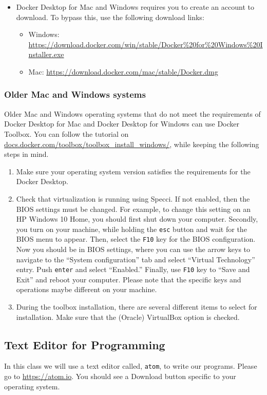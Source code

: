 \begin{itemize}
	\item Docker Desktop for Mac and Windows requires you to create an account to download. To bypass this, use the following download links:
	\begin{itemize}
		\item Windows: \url{ https://download.docker.com/win/stable/Docker%20for%20Windows%20Installer.exe}
		\item Mac: \url{ https://download.docker.com/mac/stable/Docker.dmg}
	\end{itemize}
\end{itemize}
	

\subsubsection*{Older Mac and Windows systems}
Older Mac and Windows operating systems that do not meet the requirements of Docker Desktop for Mac and Docker Desktop for Windows can use Docker Toolbox. You can follow the tutorial on \url{docs.docker.com/toolbox/toolbox_install_windows/}, while keeping the following steps in mind.

\begin{enumerate}
	\item Make sure your operating system version satisfies the requirements for the Docker Desktop.
	\item Check that virtualization is running using Specci. If not enabled, then the BIOS settings must be changed. For example, to change this setting on an HP Windows 10 Home, you should first shut down your computer. Secondly, you turn on your machine, while holding the {\tt esc} button and wait for the BIOS menu to appear. Then, select the {\tt F10} key for the BIOS configuration. Now you should be in BIOS settings, where you can use the arrow keys to navigate to the ``System configuration'' tab and select ``Virtual Technology'' entry. Push {\tt enter} and select ``Enabled.'' Finally, use {\tt F10} key to ``Save and Exit'' and reboot your computer. Please note that the specific keys and operations maybe different on your machine.
	\item During  the toolbox installation, there are several different items to select for installation. Make sure  that the (Oracle) VirtualBox option is checked.
\end{enumerate}

\vspace*{-.2in}
\subsection*{Text Editor for Programming}
\vspace*{-.1in}
In this class we will use a text editor called, {\tt atom}, to write our programs. Please go to \url{https://atom.io}. You should see a Download button specific to your operating system.

